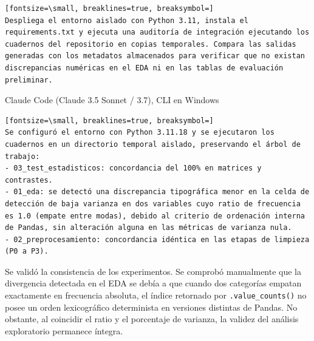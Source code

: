 \documentclass[12pt,a4paper,oneside]{book}
\begin{document}
\begin{iaprompt}
\begin{Verbatim}[fontsize=\small, breaklines=true, breaksymbol=]
Despliega el entorno aislado con Python 3.11, instala el requirements.txt y ejecuta una auditoría de integración ejecutando los cuadernos del repositorio en copias temporales. Compara las salidas generadas con los metadatos almacenados para verificar que no existan discrepancias numéricas en el EDA ni en las tablas de evaluación preliminar.
\end{Verbatim}
\end{iaprompt}
\begin{iaresp}{Claude Code (Claude 3.5 Sonnet / 3.7), CLI en Windows}
\begin{Verbatim}[fontsize=\small, breaklines=true, breaksymbol=]
Se configuró el entorno con Python 3.11.18 y se ejecutaron los cuadernos en un directorio temporal aislado, preservando el árbol de trabajo:
- 03_test_estadisticos: concordancia del 100% en matrices y contrastes.
- 01_eda: se detectó una discrepancia tipográfica menor en la celda de detección de baja varianza en dos variables cuyo ratio de frecuencia es 1.0 (empate entre modas), debido al criterio de ordenación interna de Pandas, sin alteración alguna en las métricas de varianza nula.
- 02_preprocesamiento: concordancia idéntica en las etapas de limpieza (P0 a P3).
\end{Verbatim}
\end{iaresp}
\begin{iaanalisis}
Se validó la consistencia de los experimentos. Se comprobó manualmente que la divergencia detectada en el EDA se debía a que cuando dos categorías empatan exactamente en frecuencia absoluta, el índice retornado por \texttt{.value\_counts()} no posee un orden lexicográfico determinista en versiones distintas de Pandas. No obstante, al coincidir el ratio y el porcentaje de varianza, la validez del análisis exploratorio permanece íntegra.
\end{iaanalisis}
\end{document}
